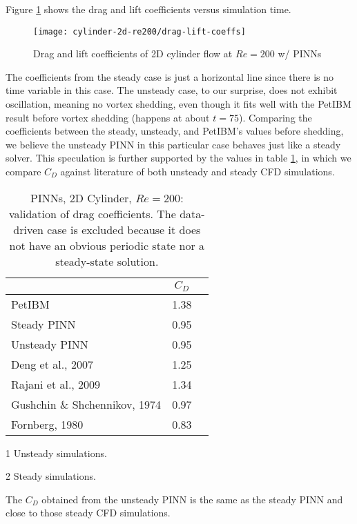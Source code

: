 Figure \ref{fig:cylinder-re200-drag-lift} shows the drag and lift coefficients versus simulation time.
\begin{figure}
    \centering%
    \texttt{[image: cylinder-2d-re200/drag-lift-coeffs]}%
    \caption{%
        Drag and lift coefficients of 2D cylinder flow at $Re=\num{200}$ w/ PINNs
    }
    \label{fig:cylinder-re200-drag-lift}%
\end{figure}
The coefficients from the steady case is just a horizontal line since there is no time variable in this case.
The unsteady case, to our surprise, does not exhibit oscillation, meaning no vortex shedding, even though it fits well with the PetIBM result before vortex shedding (happens at about $t=75$).
Comparing the coefficients between the steady, unsteady, and PetIBM's values before shedding, we believe the unsteady PINN in this particular case behaves just like a steady solver.
This speculation is further supported by the values in table \ref{table:cylinder-2d-re200-cd}, in which we compare $C_D$ against literature of both unsteady and steady CFD simulations.
\begin{table}
    \centering%
    \begin{threeparttable}[b]
        \begin{tabular}{lcc}
            \toprule
            & $C_D$ \\
            \midrule
            PetIBM & 1.38   \\
            Steady PINN & 0.95 \\
            Unsteady PINN & 0.95 \\
            Deng et al., 2007\cite{deng_hydrodynamic_2007}\tnote{1} & 1.25 \\
            Rajani et al., 2009\cite{Rajani2009}\tnote{1} & 1.34 \\
            Gushchin \& Shchennikov, 1974\cite{gushchin_numerical_1974}\tnote{2} & 0.97 \\
            Fornberg, 1980\cite{fornberg_numerical_1980}\tnote{2} & 0.83 \\
            \bottomrule
        \end{tabular}%
        \begin{tablenotes}
            \footnotesize
            \item [1] Unsteady simulations.
            \item [2] Steady simulations.
        \end{tablenotes}
        \caption{%
            PINNs, 2D Cylinder, $Re=200$: validation of drag coefficients.%
            The data-driven case is excluded because it does not have an obvious periodic state nor a steady-state solution.%
        }%
        \label{table:cylinder-2d-re200-cd}
    \end{threeparttable}
\end{table}%
The $C_D$ obtained from the unsteady PINN is the same as the steady PINN and close to those steady CFD simulations.

